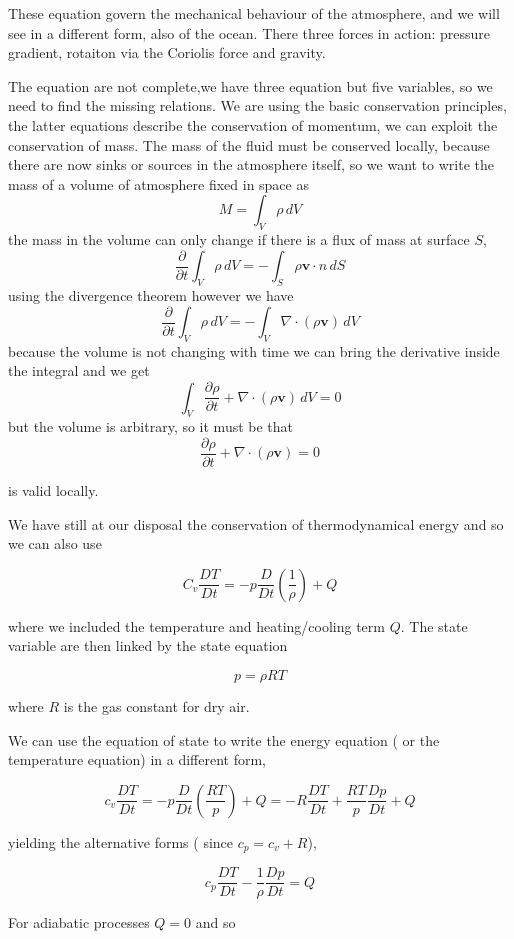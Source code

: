 These equation govern the mechanical behaviour of the atmosphere, and we
will see in a different form, also of the ocean. There three forces in
action: pressure gradient, rotaiton via the Coriolis force and gravity.

The equation are not complete,we have three equation but five variables,
so we need to find the missing relations. We are using the basic
conservation principles, the latter equations describe the conservation
of momentum, we can exploit the conservation of mass. The mass of the
fluid must be conserved locally, because there are now sinks or sources
in the atmosphere itself, so we want to write the mass of a volume of
atmosphere fixed in space as
\[M = \int_V  \rho \,dV\]
the mass in the volume can only change if there is a flux of mass at
surface \(S\),
\[\frac{\partial }{\partial t} \int_V  \rho \,dV = -\int_S \rho\mathbf{v}\cdot n \, dS\]
using the divergence theorem however we have
\[\frac{\partial }{\partial t} \int_V  \rho \,dV = -\int_V \nabla\cdot(\rho\mathbf{v}) \,dV\]
because the volume is not changing with time we can bring the derivative
inside the integral and we get
\[\int_V  \frac{\partial \rho}{\partial t}+\nabla\cdot(\rho\mathbf{v}) \,dV = 0\]
but the volume is arbitrary, so it must be that
\[\frac{\partial \rho}{\partial t}+\nabla\cdot(\rho\mathbf{v}) = 0\]

is valid locally.

We have still at our disposal the conservation of thermodynamical energy
and so we can also use

\[C_v\frac{D T}{Dt} = -p\frac{D }{Dt}\left(\frac{1}{\rho}\right)+ Q\]

where we included the temperature and heating/cooling term \(Q\). The
state variable are then linked by the state equation

\[p = \rho R T\]

where \(R\) is the gas constant for dry air.

We can use the equation of state to write the energy equation ( or the
temperature equation) in a different form,

\[c_v\frac{D T}{Dt} = -p\frac{D }{Dt}\left(\frac{R T}{p}\right)+ Q = -R\frac{D T}{Dt} + \frac{RT}{p}\frac{D p}{Dt} + Q\]

yielding the alternative forms ( since \(c_p = c_v +R\)),

\[c_p\frac{D T}{Dt}  - \frac{1}{\rho}\frac{D p}{Dt} = Q\]

For adiabatic processes \(Q=0\) and so

